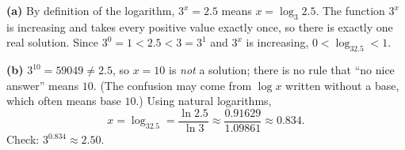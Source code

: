 \textbf{(a)} By definition of the logarithm, $3^x=2.5$ means $x=\log_3 2.5$. The function $3^x$ is increasing and takes every positive value exactly once, so there is exactly one real solution. Since $3^0=1<2.5<3=3^1$ and $3^x$ is increasing, $\boxed{0<\log_32.5<1}$.

\textbf{(b)} $3^{10}=59049\ne2.5$, so $x=10$ is \emph{not} a solution; there is no rule that ``no nice answer'' means $10$. (The confusion may come from $\log x$ written without a base, which often means base $10$.) Using natural logarithms,
\[x=\log_32.5=\dfrac{\ln2.5}{\ln3}\approx\dfrac{0.91629}{1.09861}\approx\boxed{0.834}.\]
Check: $3^{0.834}\approx2.50$.
